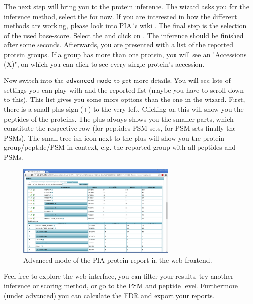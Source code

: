The next step will bring you to the protein inference. The wizard asks you for the inference method, select the  for now. If you are interested in how the different methods are working, please look into PIA´s wiki . The final step is the selection of the used base-score. Select the  and click on . The inference should be finished after some seconds. Afterwards, you are presented with a list of the reported protein groups. If a group has more than one protein, you will see an "Accessions (X)", on which you can click to see every single protein’s accession.

Now switch into the \texttt{advanced mode} to get more details. You will see lots of settings you can play with and the reported list (maybe you have to scroll down to this). This list gives you some more options than the one in the wizard. First, there is a small plus sign (+) to the very left. Clicking on this will show you the peptides of the proteins. The plus always shows you the smaller parts, which constitute the respective row (for peptides PSM sets, for PSM sets finally the PSMs). The small tree-ish icon next to the plus will show you the protein group/peptide/PSM in context, e.g. the reported group with all peptides and PSMs.

\begin{figure}
\centering
\includegraphics[width=0.7\textwidth]{graphics/protein_inference/pia_protein_list}
\caption{Advanced mode of the PIA protein report in the web frontend.}
\label{fig:pia_advanced_protein}
\end{figure}

\begin{task}
Feel free to explore the web interface, you can filter your results, try another inference or scoring method, or go to the PSM and peptide level. Furthermore (under advanced) you can calculate the FDR and export your reports.
\end{task}



